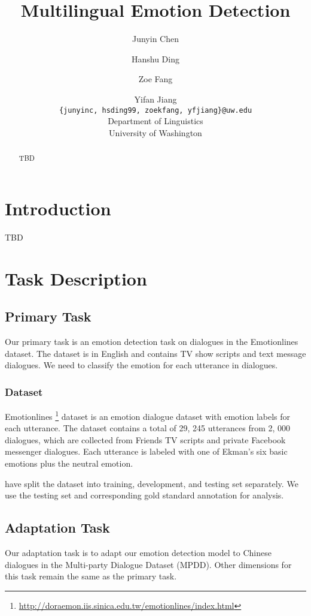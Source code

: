 \documentclass[11pt,a4paper]{article}
\title{Multilingual Emotion Detection}
\author{Junyin Chen \and Hanshu Ding \and Zoe Fang \and Yifan Jiang \\
		\texttt{\{junyinc, hsding99, zoekfang, yfjiang\}@uw.edu} \\
        Department of Linguistics \\ University of Washington}
\date{}
\begin{document}
\maketitle
\begin{abstract}
TBD
\end{abstract}

\section{Introduction}

TBD


\section{Task Description}
\subsection{Primary Task}
\label{sect:primary_task}

Our primary task is an emotion detection task on dialogues in the Emotionlines dataset. The dataset is in English and contains TV show scripts and text message dialogues. We need to classify the emotion for each utterance in dialogues.

\subsubsection{Dataset}

Emotionlines \citep{hsu-etal-2018-emotionlines}\footnote{\url{http://doraemon.iis.sinica.edu.tw/emotionlines/index.html}} dataset is an emotion dialogue dataset with emotion labels for each utterance. The dataset contains a total of 29, 245 utterances from 2, 000 dialogues, which are collected from Friends TV scripts and private Facebook messenger dialogues. Each utterance is labeled with one of Ekman’s six basic emotions plus the neutral emotion.

\citet{hsu-etal-2018-emotionlines} have split the dataset into training, development, and testing set separately. We use the testing set and corresponding gold standard annotation for analysis.

\subsection{Adaptation Task}
\label{sect:adaptation_task}

Our adaptation task is to adapt our emotion detection model to Chinese dialogues in the Multi-party Dialogue Dataset (MPDD). Other dimensions for this task remain the same as the primary task.
\end{document}
